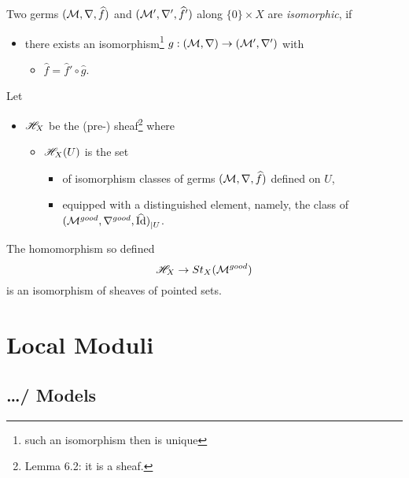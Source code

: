 \begin{defn}
  Two germs $(\mathcal{M},\nabla,\widehat f)$ and $(\mathcal{M}',\nabla',\widehat f')$ along
  $\{0\}\times X$ are \emph{isomorphic}, if
  \begin{itemize}
    \item there exists an isomorphism\footnote{such an isomorphism then is
      unique} $g:(\mathcal{M},\nabla)\to(\mathcal{M}',\nabla')$ with
      \begin{itemize}
        \item $\hat f=\hat f'\circ\hat g$.
      \end{itemize}
  \end{itemize}
\end{defn}
Let
\begin{itemize}
  \item $\mathscr{H}_X$ be the (pre-) sheaf\footnote{Lemma 6.2: it is a sheaf.} where
    \begin{itemize}
      \item $\mathscr{H}_X(U)$ is the set
        \begin{itemize}
          \item of isomorphism classes of germs $(\mathcal{M},\nabla,\widehat f)$ defined
            on $U$,
          \item equipped with a distinguished element, namely, the class of
            ${(\mathcal{M}^{good},\nabla^{good},\widehat{\operatorname{Id}})}_{|U}$.
        \end{itemize}
    \end{itemize}
\end{itemize}
\begin{thm}
  The homomorphism so defined
  \[
    \mathscr{H}_X\to St_X(\mathcal{M}^{good})
  \]
  is an isomorphism of sheaves of pointed sets.
\end{thm}

\section{Local Moduli}
\subsection{\dots / Models}

